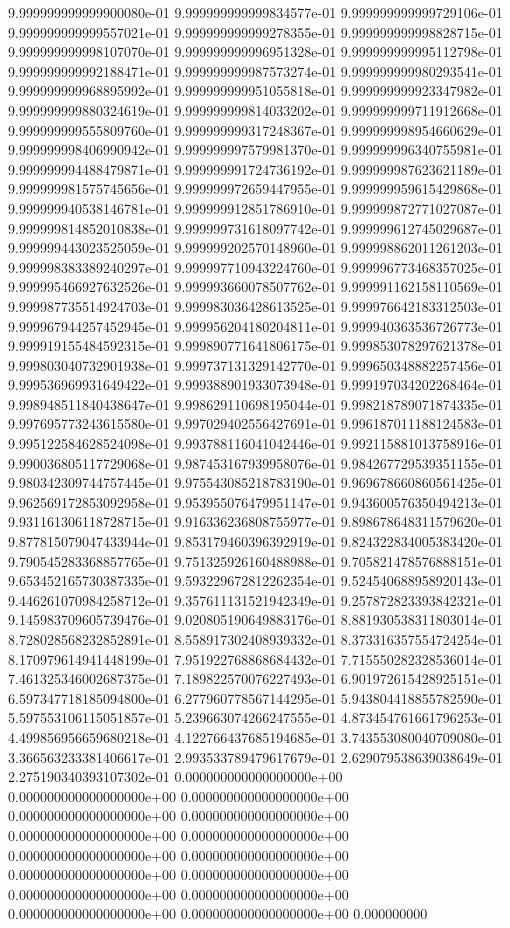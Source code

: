 9.999999999999900080e-01	9.999999999999834577e-01	9.999999999999729106e-01	9.999999999999557021e-01	9.999999999999278355e-01	9.999999999998828715e-01	9.999999999998107070e-01	9.999999999996951328e-01	9.999999999995112798e-01	9.999999999992188471e-01	9.999999999987573274e-01	9.999999999980293541e-01	9.999999999968895992e-01	9.999999999951055818e-01	9.999999999923347982e-01	9.999999999880324619e-01	9.999999999814033202e-01	9.999999999711912668e-01	9.999999999555809760e-01	9.999999999317248367e-01	9.999999998954660629e-01	9.999999998406990942e-01	9.999999997579981370e-01	9.999999996340755981e-01	9.999999994488479871e-01	9.999999991724736192e-01	9.999999987623621189e-01	9.999999981575745656e-01	9.999999972659447955e-01	9.999999959615429868e-01	9.999999940538146781e-01	9.999999912851786910e-01	9.999999872771027087e-01	9.999999814852010838e-01	9.999999731618097742e-01	9.999999612745029687e-01	9.999999443023525059e-01	9.999999202570148960e-01	9.999998862011261203e-01	9.999998383389240297e-01	9.999997710943224760e-01	9.999996773468357025e-01	9.999995466927632526e-01	9.999993660078507762e-01	9.999991162158110569e-01	9.999987735514924703e-01	9.999983036428613525e-01	9.999976642183312503e-01	9.999967944257452945e-01	9.999956204180204811e-01	9.999940363536726773e-01	9.999919155484592315e-01	9.999890771641806175e-01	9.999853078297621378e-01	9.999803040732901938e-01	9.999737131329142770e-01	9.999650348882257456e-01	9.999536969931649422e-01	9.999388901933073948e-01	9.999197034202268464e-01	9.998948511840438647e-01	9.998629110698195044e-01	9.998218789071874335e-01	9.997695773243615580e-01	9.997029402556427691e-01	9.996187011188124583e-01	9.995122584628524098e-01	9.993788116041042446e-01	9.992115881013758916e-01	9.990036805117729068e-01	9.987453167939958076e-01	9.984267729539351155e-01	9.980342309744757445e-01	9.975543085218783190e-01	9.969678660860561425e-01	9.962569172853092958e-01	9.953955076479951147e-01	9.943600576350494213e-01	9.931161306118728715e-01	9.916336236808755977e-01	9.898678648311579620e-01	9.877815079047433944e-01	9.853179460396392919e-01	9.824322834005383420e-01	9.790545283368857765e-01	9.751325926160488988e-01	9.705821478576888151e-01	9.653452165730387335e-01	9.593229672812262354e-01	9.524540688958920143e-01	9.446261070984258712e-01	9.357611131521942349e-01	9.257872823393842321e-01	9.145983709605739476e-01	9.020805190649883176e-01	8.881930538311803014e-01	8.728028568232852891e-01	8.558917302408939332e-01	8.373316357554724254e-01	8.170979614941448199e-01	7.951922768868684432e-01	7.715550282328536014e-01	7.461325346002687375e-01	7.189822570076227493e-01	6.901972615428925151e-01	6.597347718185094800e-01	6.277960778567144295e-01	5.943804418855782590e-01	5.597553106115051857e-01	5.239663074266247555e-01	4.873454761661796253e-01	4.499856956659680218e-01	4.122766437685194685e-01	3.743553080040709080e-01	3.366563233381406617e-01	2.993533789479617679e-01	2.629079538639038649e-01	2.275190340393107302e-01	0.000000000000000000e+00	0.000000000000000000e+00	0.000000000000000000e+00	0.000000000000000000e+00	0.000000000000000000e+00	0.000000000000000000e+00	0.000000000000000000e+00	0.000000000000000000e+00	0.000000000000000000e+00	0.000000000000000000e+00	0.000000000000000000e+00	0.000000000000000000e+00	0.000000000000000000e+00	0.000000000000000000e+00	0.000000000000000000e+00	0.000000000